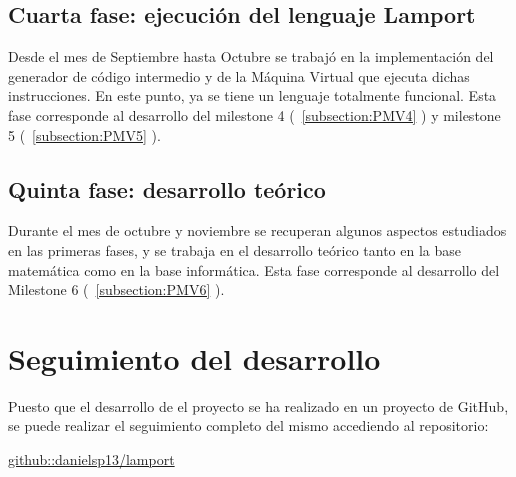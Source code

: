 \subsection{Cuarta fase: ejecución del lenguaje Lamport}
Desde el mes de Septiembre hasta Octubre se trabajó en la implementación del generador de código intermedio y de la Máquina Virtual que ejecuta dichas instrucciones. En este punto, ya se tiene un lenguaje totalmente funcional. Esta fase corresponde al desarrollo del milestone 4 (~\ref{subsection:PMV4} ) y milestone 5 (~\ref{subsection:PMV5} ).

\subsection{Quinta fase: desarrollo teórico}
Durante el mes de octubre y noviembre se recuperan algunos aspectos estudiados en las primeras fases, y se trabaja en el desarrollo teórico tanto en la base matemática como en la base informática. Esta fase corresponde al desarrollo del Milestone 6 (~\ref{subsection:PMV6} ).



\section{Seguimiento del desarrollo}
Puesto que el desarrollo de el proyecto se ha realizado en un proyecto de GitHub, se puede realizar el seguimiento completo del mismo accediendo al repositorio:

\begin{center}
    \href{https://github.com/danielsp13/lamport}{github::danielsp13/lamport}
\end{center}